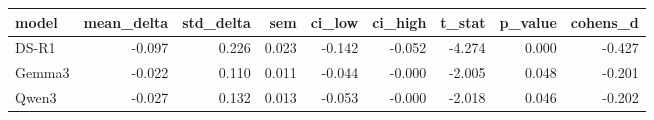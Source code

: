 \begin{tabular}{lrrrrrrrr}
\toprule
model & mean\_delta & std\_delta & sem & ci\_low & ci\_high & t\_stat & p\_value & cohens\_d \\
\midrule
DS-R1 & -0.097 & 0.226 & 0.023 & -0.142 & -0.052 & -4.274 & 0.000 & -0.427 \\
Gemma3 & -0.022 & 0.110 & 0.011 & -0.044 & -0.000 & -2.005 & 0.048 & -0.201 \\
Qwen3 & -0.027 & 0.132 & 0.013 & -0.053 & -0.000 & -2.018 & 0.046 & -0.202 \\
\bottomrule
\end{tabular}
